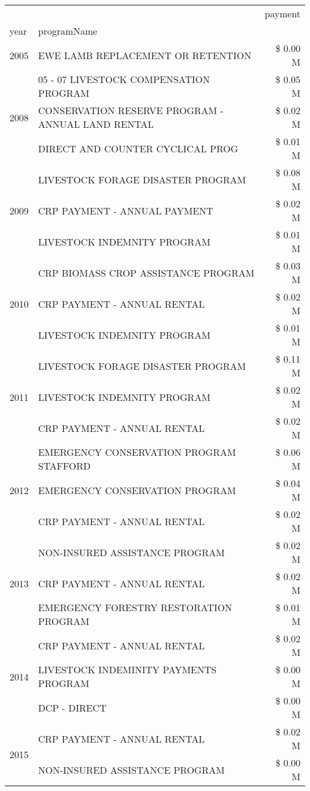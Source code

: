 \begin{tabular}{llr}
\toprule
 &  & payment \\
year & programName &  \\
\midrule
2005 & EWE LAMB REPLACEMENT OR RETENTION & \$ 0.00 M \\
\cline{1-3}
\multirow[t]{3}{*}{2008} & 05 - 07 LIVESTOCK COMPENSATION PROGRAM & \$ 0.05 M \\
 & CONSERVATION RESERVE PROGRAM - ANNUAL LAND RENTAL & \$ 0.02 M \\
 & DIRECT AND COUNTER CYCLICAL PROG & \$ 0.01 M \\
\cline{1-3}
\multirow[t]{3}{*}{2009} & LIVESTOCK FORAGE DISASTER  PROGRAM & \$ 0.08 M \\
 & CRP PAYMENT - ANNUAL PAYMENT & \$ 0.02 M \\
 & LIVESTOCK INDEMNITY PROGRAM & \$ 0.01 M \\
\cline{1-3}
\multirow[t]{3}{*}{2010} & CRP BIOMASS CROP ASSISTANCE PROGRAM & \$ 0.03 M \\
 & CRP PAYMENT - ANNUAL RENTAL & \$ 0.02 M \\
 & LIVESTOCK INDEMNITY PROGRAM & \$ 0.01 M \\
\cline{1-3}
\multirow[t]{3}{*}{2011} & LIVESTOCK FORAGE DISASTER PROGRAM & \$ 0.11 M \\
 & LIVESTOCK INDEMNITY PROGRAM & \$ 0.02 M \\
 & CRP PAYMENT - ANNUAL RENTAL & \$ 0.02 M \\
\cline{1-3}
\multirow[t]{3}{*}{2012} & EMERGENCY CONSERVATION PROGRAM STAFFORD & \$ 0.06 M \\
 & EMERGENCY CONSERVATION PROGRAM & \$ 0.04 M \\
 & CRP PAYMENT - ANNUAL RENTAL & \$ 0.02 M \\
\cline{1-3}
\multirow[t]{3}{*}{2013} & NON-INSURED ASSISTANCE PROGRAM & \$ 0.02 M \\
 & CRP PAYMENT - ANNUAL RENTAL & \$ 0.02 M \\
 & EMERGENCY FORESTRY RESTORATION PROGRAM & \$ 0.01 M \\
\cline{1-3}
\multirow[t]{3}{*}{2014} & CRP PAYMENT - ANNUAL RENTAL & \$ 0.02 M \\
 & LIVESTOCK INDEMINITY PAYMENTS PROGRAM & \$ 0.00 M \\
 & DCP - DIRECT & \$ 0.00 M \\
\cline{1-3}
\multirow[t]{3}{*}{2015} & CRP PAYMENT - ANNUAL RENTAL & \$ 0.02 M \\
 & NON-INSURED ASSISTANCE PROGRAM & \$ 0.00 M \\

\end{tabular}
